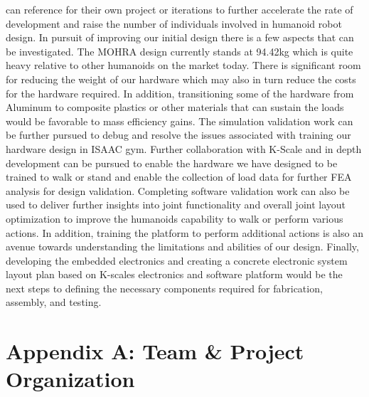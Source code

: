 \documentclass{article}
\begin{document}
can reference for their own project or iterations to further accelerate the rate of development and raise the number of individuals involved in humanoid robot design.
In pursuit of improving our initial design there is a few aspects that can be investigated. The MOHRA design currently stands at 94.42kg which is quite heavy relative to other humanoids on the market today. There is significant room for reducing the weight of our hardware which may also in turn reduce the costs for the hardware required. In addition, transitioning some of the hardware from Aluminum to composite plastics or other materials that can sustain the loads would be favorable to mass efficiency gains. The simulation validation work can be further pursued to debug and resolve the issues associated with training our hardware design in ISAAC gym. Further collaboration with K-Scale and in depth development can be pursued to enable the hardware we have designed to be trained to walk or stand and enable the collection of load data for further FEA analysis for design validation. Completing software validation work can also be used to deliver further insights into joint functionality and overall joint layout optimization to improve the humanoids capability to walk or perform various actions. In addition, training the platform to perform additional actions is also an avenue towards understanding the limitations and abilities of our design. Finally, developing the embedded electronics and creating a concrete electronic system layout plan based on K-scales electronics and software platform would be the next steps to defining the necessary components required for fabrication, assembly, and testing.  




\newpage
{}




\newpage
\section{Appendix A: Team \& Project Organization}

\newpage
\end{document}
